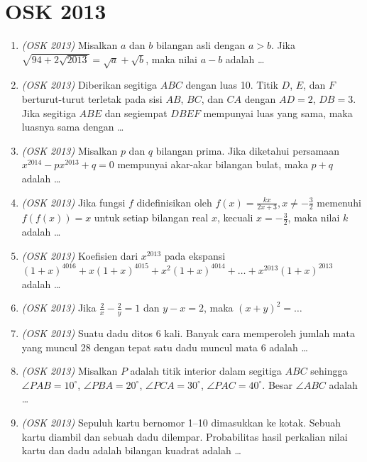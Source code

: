 \documentclass[11pt]{scrartcl}
\begin{document}
\section{OSK 2013}
\begin{enumerate}
\item \textit{(OSK 2013)} Misalkan $a$ dan $b$ bilangan asli dengan $a > b$. Jika $\sqrt{94 + 2\sqrt{2013}} = \sqrt{a} + \sqrt{b}$, maka nilai $a - b$ adalah \dots

\item \textit{(OSK 2013)} Diberikan segitiga $ABC$ dengan luas 10. Titik $D$, $E$, dan $F$ berturut-turut terletak pada sisi $AB$, $BC$, dan $CA$ dengan $AD=2$, $DB=3$. Jika segitiga $ABE$ dan segiempat $DBEF$ mempunyai luas yang sama, maka luasnya sama dengan \dots

\item \textit{(OSK 2013)} Misalkan $p$ dan $q$ bilangan prima. Jika diketahui persamaan $x^{2014} - px^{2013} + q = 0$ mempunyai akar-akar bilangan bulat, maka $p + q$ adalah \dots

\item \textit{(OSK 2013)} Jika fungsi $f$ didefinisikan oleh $f(x) = \frac{kx}{2x+3}, x \ne -\frac{3}{2}$ memenuhi $f(f(x)) = x$ untuk setiap bilangan real $x$, kecuali $x = -\frac32$, maka nilai $k$ adalah \dots

\item \textit{(OSK 2013)} Koefisien dari $x^{2013}$ pada ekspansi $(1+x)^{4016} + x(1+x)^{4015} + x^2(1+x)^{4014} + \dots + x^{2013}(1+x)^{2013}$ adalah \dots

\item \textit{(OSK 2013)} Jika $\frac{2}{x} - \frac{2}{y} = 1$ dan $y - x = 2$, maka $(x+y)^2 = \dots$

\item \textit{(OSK 2013)} Suatu dadu ditos 6 kali. Banyak cara memperoleh jumlah mata yang muncul 28 dengan tepat satu dadu muncul mata 6 adalah \dots

\item \textit{(OSK 2013)} Misalkan $P$ adalah titik interior dalam segitiga $ABC$ sehingga $\angle PAB=10^\circ$, $\angle PBA=20^\circ$, $\angle PCA=30^\circ$, $\angle PAC=40^\circ$. Besar $\angle ABC$ adalah \dots

\item \textit{(OSK 2013)} Sepuluh kartu bernomor 1–10 dimasukkan ke kotak. Sebuah kartu diambil dan sebuah dadu dilempar. Probabilitas hasil perkalian nilai kartu dan dadu adalah bilangan kuadrat adalah \dots


\end{enumerate}
\end{document}
